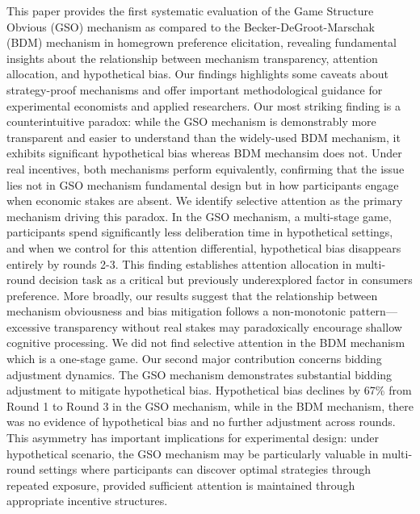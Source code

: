 \documentclass[12pt]{article}
\begin{document}
This paper provides the first systematic evaluation of the Game Structure Obvious (GSO) mechanism as compared to the Becker-DeGroot-Marschak (BDM) mechanism in homegrown preference elicitation, revealing fundamental insights about the relationship between mechanism transparency, attention allocation, and hypothetical bias. Our findings highlights some caveats about strategy-proof mechanisms and offer important methodological guidance for experimental economists and applied researchers.
Our most striking finding is a counterintuitive paradox: while the GSO mechanism is demonstrably more transparent and easier to understand than the widely-used BDM mechanism, it exhibits significant hypothetical bias whereas BDM mechansim does not. Under real incentives, both mechanisms perform equivalently, confirming that the issue lies not in GSO mechanism fundamental design but in how participants engage when economic stakes are absent.
We identify selective attention as the primary mechanism driving this paradox. In the GSO mechanism, a multi-stage game, participants spend significantly less deliberation time in hypothetical settings, and when we control for this attention differential, hypothetical bias disappears entirely by rounds 2-3. This finding establishes attention allocation in multi-round decision task as a critical but previously underexplored factor in consumers preference. More broadly, our results suggest that the relationship between mechanism obviousness and bias mitigation follows a non-monotonic pattern—excessive transparency without real stakes may paradoxically encourage shallow cognitive processing. We did not find selective attention in the BDM mechanism which is a one-stage game.
Our second major contribution concerns bidding adjustment dynamics. The GSO mechanism demonstrates substantial bidding adjustment to mitigate hypothetical bias. Hypothetical bias declines by 67\% from Round 1 to Round 3 in the GSO mechanism, while in the BDM mechanism, there was no evidence of hypothetical bias and no further adjustment across rounds. This asymmetry has important implications for experimental design: under hypothetical scenario, the GSO mechanism may be particularly valuable in multi-round settings where participants can discover optimal strategies through repeated exposure, provided sufficient attention is maintained through appropriate incentive structures.
\end{document}
